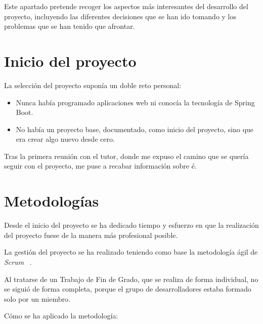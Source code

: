 
Este apartado pretende recoger los aspectos más interesantes del desarrollo del proyecto, incluyendo las diferentes decisiones que se han ido tomando y los problemas que se han tenido que afrontar.

\section{Inicio del proyecto}

La selección del proyecto suponía un doble reto personal:

\begin{itemize}
	\item Nunca había programado aplicaciones web ni conocía la tecnología de Spring Boot.
	\item No había un proyecto base, documentado, como inicio del proyecto, sino que era crear algo nuevo desde cero.
\end{itemize}

Tras la primera reunión con el tutor, donde me expuso el camino que se quería seguir con el proyecto, me puse a recabar información sobre é.

\section{Metodologías}

Desde el inicio del proyecto se ha dedicado tiempo y esfuerzo en que la realización del proyecto fuese de la manera más profesional posible.

La gestión del proyecto se ha realizado teniendo como base la metodología ágil de \textit{Scrum} ~\cite{web:scrum}.

Al tratarse de un Trabajo de Fin de Grado, que se realiza de forma individual, no se siguió de forma completa, porque el grupo de desarrolladores estaba formado solo por un miembro.

Cómo se ha aplicado la metodología:

